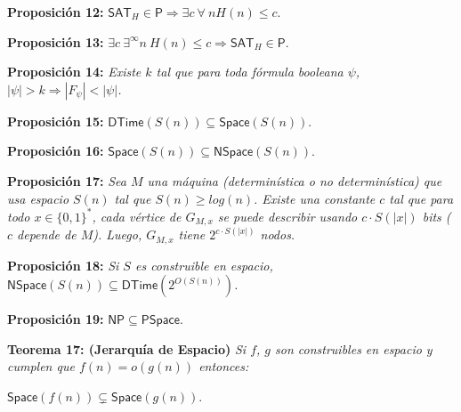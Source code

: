 \documentclass{article}
\begin{document}
\begin{flushleft}
  \textbf{Proposición 12:}
  $\mathsf{SAT}_H \in \mathsf{P} \Rightarrow \exists c \ \forall \ n H(n) \leq c$.
\end{flushleft}

\begin{flushleft}
  \textbf{Proposición 13:}
  $\exists c \ \exists^ {\infty} n \ H(n) \leq c \Rightarrow \mathsf{SAT}_H \in \mathsf{P}$.
\end{flushleft}

\begin{flushleft}
  \textbf{Proposición 14:}
  \textit{Existe $k$ tal que para toda fórmula booleana $\psi$, $|\psi| > k \Rightarrow |F_\psi| <
  |\psi|$.}
\end{flushleft}

\begin{flushleft}
  \textbf{Proposición 15:}
  $\mathsf{DTime}(S(n)) \subseteq \mathsf{Space}(S(n))$.
\end{flushleft}

\begin{flushleft}
  \textbf{Proposición 16:}
  $\mathsf{Space}(S(n)) \subseteq \mathsf{NSpace}(S(n))$.
\end{flushleft}

\begin{flushleft}
  \textbf{Proposición 17:}
  \textit{Sea $M$ una máquina (determinística o no determinística) que usa espacio $S(n)$ tal que
  $S(n) \geq log(n)$. Existe una constante $c$ tal que para todo $x \in \{ 0,1 \}^*$, cada vértice
  de $G_{M, x}$ se puede describir usando $c \cdot S(|x|)$ bits ($c$ depende de $M$). Luego, $G_{M,x}$
  tiene $2^{c \cdot S(|x|)}$ nodos.}
\end{flushleft}

\begin{flushleft}
  \textbf{Proposición 18:}
  \textit{Si $S$ es construible en espacio, $\mathsf{NSpace}(S(n)) \subseteq \mathsf{DTime}(2^{O(S(n))})$.}
\end{flushleft}

\begin{flushleft}
  \textbf{Proposición 19:}
  $\mathsf{NP} \subseteq \mathsf{PSpace}$.
\end{flushleft}

\begin{flushleft}
  \textbf{Teorema 17: \hypertarget{jerEspacio}{\textcolor{Bittersweet}{(Jerarquía de Espacio)}}}
  \textit{Si $f$, $g$ son construibles en espacio y cumplen que $f(n) = o(g(n))$ entonces:}
\end{flushleft}
\begin{center}
  $\mathsf{Space}(f(n)) \subsetneq \mathsf{Space}(g(n))$.
\end{center}
\end{document}
